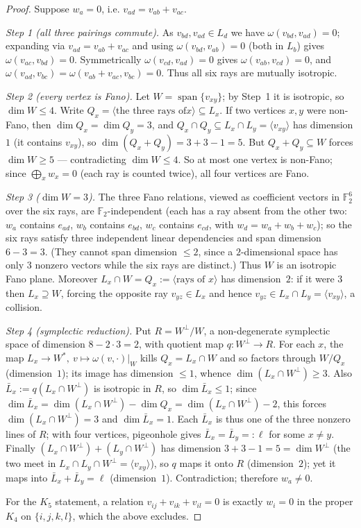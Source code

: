 \documentclass[11pt,a4paper]{article}
\theoremstyle{remark}
\begin{document}
\begin{proof}
Suppose $w_a=0$, i.e. $v_{ad}=v_{ab}+v_{ac}$.

\emph{Step 1 (all three pairings commute).} As $v_{bd},v_{ad}\in L_d$ we have
$\omega(v_{bd},v_{ad})=0$; expanding via $v_{ad}=v_{ab}+v_{ac}$ and using
$\omega(v_{bd},v_{ab})=0$ (both in $L_b$) gives $\omega(v_{ac},v_{bd})=0$.
Symmetrically $\omega(v_{cd},v_{ad})=0$ gives $\omega(v_{ab},v_{cd})=0$, and
$\omega(v_{ad},v_{bc})=\omega(v_{ab}+v_{ac},v_{bc})=0$. Thus all six rays are
mutually isotropic.

\emph{Step 2 (every vertex is Fano).} Let $W=\operatorname{span}\{v_{xy}\}$; by
Step~1 it is isotropic, so $\dim W\leq 4$. Write $Q_x=\langle\text{the three rays of
}x\rangle\subseteq L_x$. If two vertices $x,y$ were non-Fano, then $\dim Q_x=\dim
Q_y=3$, and $Q_x\cap Q_y\subseteq L_x\cap L_y=\langle v_{xy}\rangle$ has dimension
$1$ (it contains $v_{xy}$), so $\dim(Q_x+Q_y)=3+3-1=5$. But $Q_x+Q_y\subseteq W$
forces $\dim W\geq 5$ --- contradicting $\dim W\leq 4$. So at most one vertex is
non-Fano; since $\bigoplus_x w_x=0$ (each ray is counted twice), all four vertices
are Fano.

\emph{Step 3 ($\dim W=3$).} The three Fano relations, viewed as coefficient vectors
in $\mathbb{F}_2^6$ over the six rays, are $\mathbb{F}_2$-independent (each has a ray
absent from the other two: $w_a$ contains $e_{ad}$, $w_b$ contains $e_{bd}$,
$w_c$ contains $e_{cd}$, with $w_d=w_a+w_b+w_c$); so the six rays satisfy
three independent linear dependencies and span dimension $6-3=3$. (They cannot span dimension
$\leq 2$, since a $2$-dimensional space has only $3$ nonzero vectors while the six
rays are distinct.) Thus $W$ is an isotropic Fano plane.
Moreover $L_x\cap W=Q_x:=\langle\text{rays of }x\rangle$ has dimension~$2$: if it were
$3$ then $L_x\supseteq W$, forcing the opposite ray $v_{yz}\in L_x$ and hence
$v_{yz}\in L_x\cap L_y=\langle v_{xy}\rangle$, a collision.

\emph{Step 4 (symplectic reduction).} Put $R=W^\perp/W$, a non-degenerate symplectic
space of dimension $8-2\cdot3=2$, with quotient map $q\colon W^\perp\to R$. For each
$x$, the map $L_x\to W^\ast,\ v\mapsto\omega(v,\cdot)|_W$ kills $Q_x=L_x\cap W$ and so
factors through $W/Q_x$ (dimension~$1$); its image has dimension $\leq 1$, whence
$\dim(L_x\cap W^\perp)\geq 3$. Also $\bar L_x:=q(L_x\cap W^\perp)$ is isotropic in
$R$, so $\dim\bar L_x\leq 1$; since $\dim\bar L_x=\dim(L_x\cap W^\perp)-\dim Q_x
=\dim(L_x\cap W^\perp)-2$, this forces $\dim(L_x\cap W^\perp)=3$ and
$\dim\bar L_x=1$. Each $\bar L_x$ is thus one of the three nonzero lines of $R$; with
four vertices, pigeonhole gives $\bar L_x=\bar L_y=:\ell$ for some $x\neq y$. Finally
$(L_x\cap W^\perp)+(L_y\cap W^\perp)$ has dimension $3+3-1=5=\dim W^\perp$ (the two
meet in $L_x\cap L_y\cap W^\perp=\langle v_{xy}\rangle$), so $q$ maps it onto $R$
(dimension~$2$); yet it maps into $\bar L_x+\bar L_y=\ell$ (dimension~$1$).
Contradiction; therefore $w_a\neq 0$.

For the $K_5$ statement, a relation $v_{ij}+v_{ik}+v_{il}=0$ is exactly $w_i=0$ in
the proper $K_4$ on $\{i,j,k,l\}$, which the above excludes.
\end{proof}
\end{document}
